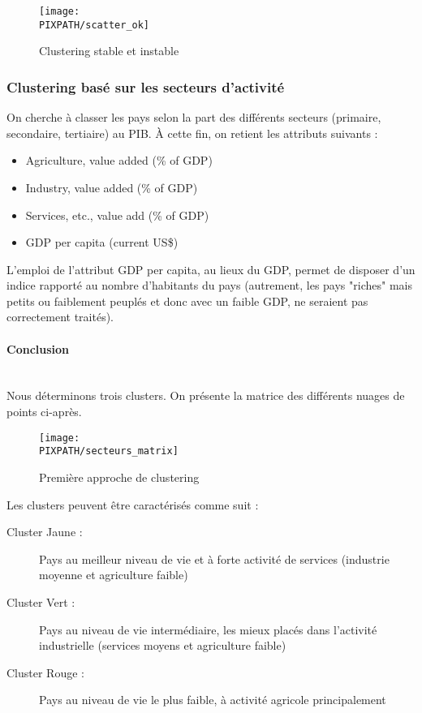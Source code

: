 \begin{figure}[h]
\centering
\caption{Clustering stable et instable}
\texttt{[image: \\PIXPATH/scatter\_ok]}
\end{figure}


\subsubsection{Clustering basé sur les secteurs d'activité}

On cherche à classer les pays selon la part des différents secteurs
(primaire, secondaire, tertiaire) au PIB. À cette fin, on retient les
attributs suivants :
\begin{itemize}
\item Agriculture, value added (\% of GDP)
\item Industry, value added (\% of GDP)
\item Services, etc., value add (\% of GDP)
\item GDP per capita (current US\$)
\end{itemize}

\vskip 6pt

L'emploi de l'attribut GDP per capita, au lieux du GDP, permet de disposer
d'un indice rapporté au nombre d'habitants du pays (autrement, les pays
"riches" mais petits ou faiblement peuplés et donc avec un faible GDP, ne
seraient pas correctement traités).

\paragraph{Conclusion}\hfill\\

Nous déterminons trois clusters. On présente la matrice des différents
nuages de points ci-après.

\begin{sidewaysfigure}[h]
\centering
\caption{Première approche de clustering}
\texttt{[image: \\PIXPATH/secteurs\_matrix]}
\end{sidewaysfigure}

Les clusters peuvent être caractérisés comme suit :
\begin{description}
\item[Cluster Jaune : ] Pays au meilleur niveau de vie et à forte activité de services (industrie moyenne et agriculture faible)
\item[Cluster Vert : ] Pays au niveau de vie intermédiaire, les mieux placés dans l'activité industrielle (services moyens et agriculture faible)
\item[Cluster Rouge :] Pays au niveau de vie le plus faible, à activité agricole principalement
\end{description}

